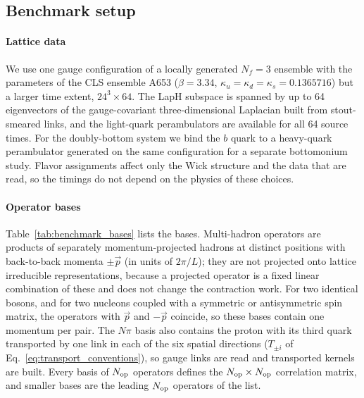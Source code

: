\documentclass[a4paper,fleqn]{cas-dc}
\begin{document}
\subsection{Benchmark setup}
\label{sec:benchmark_setup}

\paragraph{Lattice data}
We use one gauge configuration of a locally generated \(N_f=3\) ensemble with
the parameters of the CLS ensemble A653 (\(\beta=3.34\),
\(\kappa_{u}=\kappa_d=\kappa_s=0.1365716\)) but a larger time extent,
\(24^3\times64\). The LapH subspace is spanned by up to 64 eigenvectors of the
gauge-covariant three-dimensional Laplacian built from stout-smeared links,
and the light-quark perambulators are available for all 64 source times. For
the doubly-bottom system we bind the \(b\) quark to a heavy-quark perambulator
generated on the same configuration for a separate bottomonium study. Flavor
assignments affect only the Wick structure and the data that are read, so the
timings do not depend on the physics of these choices.

\paragraph{Operator bases}
Table~\ref{tab:benchmark_bases} lists the bases. Multi-hadron operators are
products of separately momentum-projected hadrons at distinct positions with
back-to-back momenta \(\pm\vec p\) (in units of \(2\pi/L\)); they are not
projected onto lattice irreducible representations, because a projected operator
is a fixed linear combination of these and does not change the contraction
work. For two identical bosons, and for two nucleons coupled with a symmetric or
antisymmetric spin matrix, the operators with \(\vec p\) and \(-\vec p\) coincide,
so these bases contain one momentum per pair. The \(N\pi\) basis also contains the
proton with its third quark transported by one link in each of the six spatial
directions (\(T_{\pm i}\) of Eq.~\eqref{eq:transport_conventions}), so gauge links are read and
transported kernels are built. Every basis of \(N_{\rm op}\) operators defines the
\(N_{\rm op}\times N_{\rm op}\) correlation matrix, and smaller bases are the
leading \(N_{\rm op}\) operators of the list.
\end{document}
